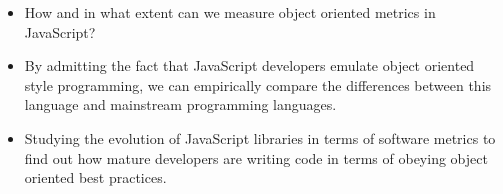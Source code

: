
\rqiii




\begin{itemize}
	\item How and in what extent can we measure object oriented metrics in JavaScript?
	\item  By admitting the fact that JavaScript developers emulate object oriented style programming, we can empirically compare the differences between this language and mainstream programming languages.
	\item Studying the evolution of JavaScript libraries in terms of software metrics to find out how mature developers are writing code in terms of obeying object oriented best practices.
\end{itemize}
	

	
	

